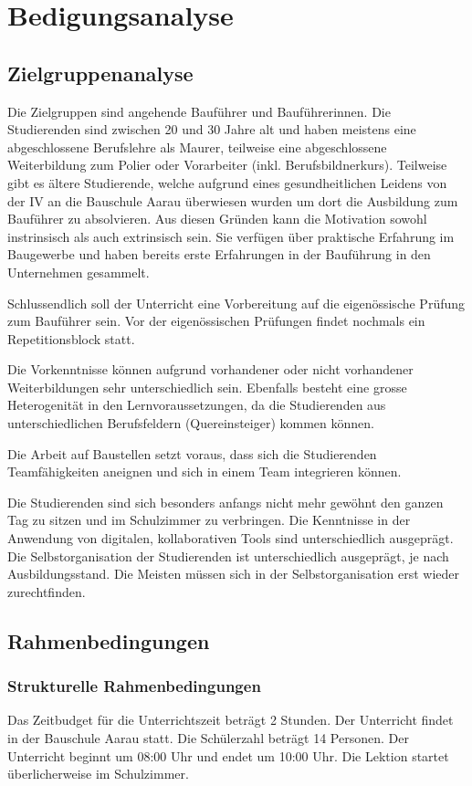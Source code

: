 \documentclass[
11pt,
captions=tableheading,
headsepline,
footsepline, 
captions=tableheading,
parskip=half-,
]{scrartcl}
\begin{document}
\clearpage

\section{Bedigungsanalyse}

\subsection{Zielgruppenanalyse}
Die Zielgruppen sind angehende Bauführer und Bauführerinnen. Die Studierenden sind zwischen 20 und 30 Jahre alt und haben meistens eine abgeschlossene Berufslehre als Maurer, teilweise eine abgeschlossene Weiterbildung zum Polier oder Vorarbeiter (inkl. Berufsbildnerkurs). 
Teilweise gibt es ältere Studierende, welche aufgrund eines gesundheitlichen Leidens von der IV an die Bauschule Aarau überwiesen wurden um dort die Ausbildung zum Bauführer zu absolvieren.
Aus diesen Gründen kann die Motivation sowohl instrinsisch als auch extrinsisch sein.
Sie verfügen über praktische Erfahrung im Baugewerbe und haben bereits erste Erfahrungen in der Bauführung in den Unternehmen gesammelt.

Schlussendlich soll der Unterricht eine Vorbereitung auf die eigenössische Prüfung zum Bauführer sein. 
Vor der eigenössischen Prüfungen findet nochmals ein Repetitionsblock statt. 

Die Vorkenntnisse können aufgrund vorhandener oder nicht vorhandener Weiterbildungen sehr unterschiedlich sein. 
Ebenfalls besteht eine grosse Heterogenität in den Lernvoraussetzungen, da die Studierenden aus unterschiedlichen Berufsfeldern (Quereinsteiger) kommen können.

Die Arbeit auf Baustellen setzt voraus, dass sich die Studierenden Teamfähigkeiten aneignen und sich in einem Team integrieren können. 

Die Studierenden sind sich besonders anfangs nicht mehr gewöhnt den ganzen Tag zu sitzen und im Schulzimmer zu verbringen. 
Die Kenntnisse in der Anwendung von digitalen, kollaborativen Tools sind unterschiedlich ausgeprägt.
Die Selbstorganisation der Studierenden ist unterschiedlich ausgeprägt, je nach Ausbildungsstand. 
Die Meisten müssen sich in der Selbstorganisation erst wieder zurechtfinden.

\subsection{Rahmenbedingungen}
\subsubsection{Strukturelle Rahmenbedingungen}
Das Zeitbudget für die Unterrichtszeit beträgt 2 Stunden. Der Unterricht findet in der Bauschule Aarau statt. Die Schülerzahl beträgt 14 Personen. Der Unterricht beginnt um 08:00 Uhr und endet um 10:00 Uhr.
Die Lektion startet überlicherweise im Schulzimmer.
\end{document}
